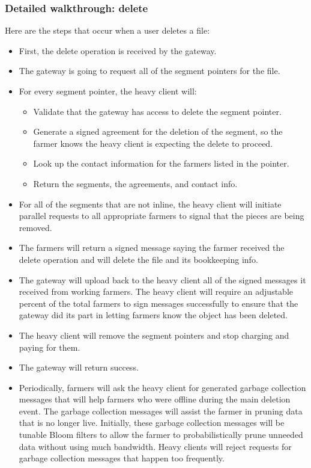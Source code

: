 \documentclass[a4paper,10pt]{article} \usepackage[utf8]{inputenc}
\begin{document}
\subsubsection{Detailed walkthrough: delete}

Here are the steps that occur when a user deletes a file:

\begin{itemize}
\item First, the delete operation is received by the gateway.
\item The gateway is going to request all of the segment pointers for the file.
\item For every segment pointer, the heavy client will:
  \begin{itemize}
  \item Validate that the gateway has access to delete the segment pointer.
  \item Generate a signed agreement for the deletion of the segment, so the
    farmer knows the heavy client is expecting the delete to proceed.
  \item Look up the contact information for the farmers listed in the pointer.
  \item Return the segments, the agreements, and contact info.
  \end{itemize}
\item For all of the segments that are not inline, the heavy client will
  initiate parallel requests to all appropriate farmers to signal that the
  pieces are being removed.
\item The farmers will return a signed message saying the farmer received the
  delete operation and will delete the file and its bookkeeping info.
\item The gateway will upload back to the heavy client all of the signed
  messages it received from working farmers. The heavy client will require an
  adjustable percent of the total farmers to sign messages successfully
  to ensure that the gateway did its part in letting farmers know the object
  has been deleted.
\item The heavy client will remove the segment pointers and stop charging and
  paying for them.
\item The gateway will return success.
\item Periodically, farmers will ask the heavy client for generated garbage
  collection messages that will help farmers who were offline during the main
  deletion event.
  The garbage collection messages will assist the farmer in pruning data that is
  no longer live. Initially, these garbage collection messages will be tunable
  Bloom filters to allow the farmer to probabilistically prune unneeded data
  without using much bandwidth.
  Heavy clients will reject requests for garbage collection messages that
  happen too frequently.
\end{itemize}
\end{document}
